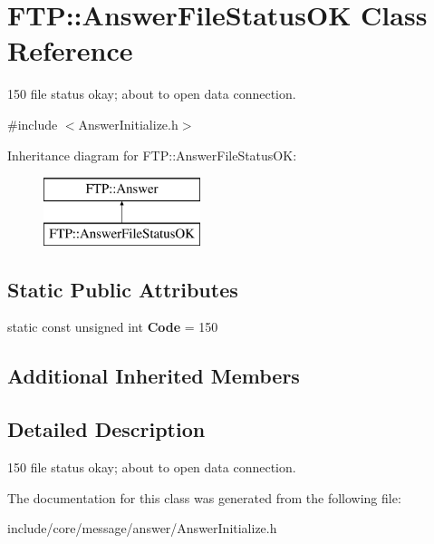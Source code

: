 \hypertarget{class_f_t_p_1_1_answer_file_status_o_k}{\section{F\-T\-P\-:\-:Answer\-File\-Status\-O\-K Class Reference}
\label{class_f_t_p_1_1_answer_file_status_o_k}
}


150 file status okay; about to open data connection.  




{\ttfamily \#include $<$Answer\-Initialize.\-h$>$}

Inheritance diagram for F\-T\-P\-:\-:Answer\-File\-Status\-O\-K\-:\begin{figure}[H]
\begin{center}
\leavevmode
\includegraphics[height=2.000000cm]{class_f_t_p_1_1_answer_file_status_o_k}
\end{center}
\end{figure}
\subsection*{Static Public Attributes}
\begin{DoxyCompactItemize}
\item 
\hypertarget{class_f_t_p_1_1_answer_file_status_o_k_abbcdece8e9af326b425d4d0ec456835b}{static const unsigned int {\bfseries Code} = 150}\label{class_f_t_p_1_1_answer_file_status_o_k_abbcdece8e9af326b425d4d0ec456835b}

\end{DoxyCompactItemize}
\subsection*{Additional Inherited Members}


\subsection{Detailed Description}
150 file status okay; about to open data connection. 

The documentation for this class was generated from the following file\-:\begin{DoxyCompactItemize}
\item 
include/core/message/answer/Answer\-Initialize.\-h\end{DoxyCompactItemize}
